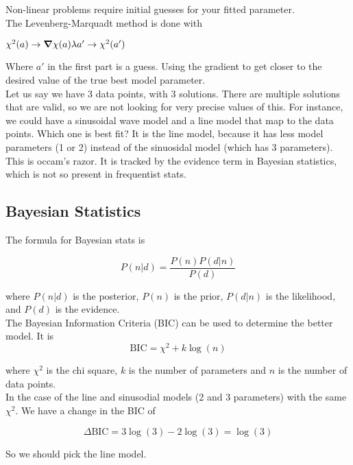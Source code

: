 \documentclass[]{article}
\begin{document}
Non-linear problems require initial guesses for your fitted parameter.\\

The Levenberg-Marquadt method is done with

$\chi^2(a) \to \grad{\chi(a)} \lambda a' \to \chi^2(a')$

Where $a'$ in the first part is a guess. Using the gradient to get closer to the desired value of the true best model parameter. \\

Let us say we have 3 data points, with 3 solutions. There are multiple solutions that are valid, so we are not looking for very precise values of this. For instance, we could have a sinusoidal wave model and a line model that map to the data points. Which one is best fit? It is the line model, because it has less model parameters (1 or 2) instead of the sinuosidal model (which has 3 parameters). This is occam's razor. It is tracked by the evidence term in Bayesian statistics, which is not so present in frequentist stats. \\

\subsection{Bayesian Statistics}\bigbreak

The formula for Bayesian stats is 

\[ P(n|d) = \frac{P(n) P(d|n)}{P(d)} \]

where $P(n|d)$ is the posterior, $P(n)$ is the prior, $P(d|n)$ is the likelihood, and $P(d)$ is the evidence.\\

The Bayesian Information Criteria (BIC) can be used to determine the better model. It is\\

\[\text{BIC} = \chi^2 + k\log(n)\]

where $\chi^2$ is the chi square, $k$ is the number of parameters and $n$ is the number of data points.\\

In the case of the line and sinusodial models (2 and 3 parameters) with the same $\chi^2$. We have a change in the BIC of 

\[\Delta \text{BIC} = 3\log(3)  - 2\log(3) = \log(3)\]

So we should pick the line model.\\
\end{document}
